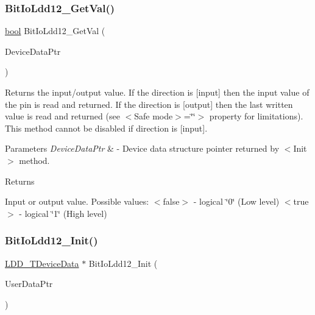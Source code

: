 \subsubsection{\texorpdfstring{Bit\+Io\+Ldd12\+\_\+\+Get\+Val()}{BitIoLdd12\_GetVal()}}
{\footnotesize\ttfamily \hyperlink{group___p_e___types__module_ga97a80ca1602ebf2303258971a2c938e2}{bool} Bit\+Io\+Ldd12\+\_\+\+Get\+Val (\begin{DoxyParamCaption}\item[{\hyperlink{group___p_e___types__module_gac5cf1362f1f0e3a2ce71b1bf2276d091}{L\+D\+D\+\_\+\+T\+Device\+Data} $\ast$}]{Device\+Data\+Ptr }\end{DoxyParamCaption})}



Returns the input/output value. If the direction is \mbox{[}input\mbox{]} then the input value of the pin is read and returned. If the direction is \mbox{[}output\mbox{]} then the last written value is read and returned (see $<$\+Safe mode$>$=\char`\"{}\char`\"{}$>$ property for limitations). This method cannot be disabled if direction is \mbox{[}input\mbox{]}. 


\begin{DoxyParams}{Parameters}
{\em Device\+Data\+Ptr} & -\/ Device data structure pointer returned by $<$\+Init$>$ method. \\
\hline
\end{DoxyParams}
\begin{DoxyReturn}{Returns}

\begin{DoxyItemize}
\item Input or output value. Possible values\+: $<$false$>$ -\/ logical \char`\"{}0\char`\"{} (Low level) $<$true$>$ -\/ logical \char`\"{}1\char`\"{} (High level) 
\end{DoxyItemize}
\end{DoxyReturn}
\mbox{\label{group___bit_io_ldd12__module_ga504f7c338d40c89bfbb418cd2c1c3a8b}} 
\subsubsection{\texorpdfstring{Bit\+Io\+Ldd12\+\_\+\+Init()}{BitIoLdd12\_Init()}}
{\footnotesize\ttfamily \hyperlink{group___p_e___types__module_gac5cf1362f1f0e3a2ce71b1bf2276d091}{L\+D\+D\+\_\+\+T\+Device\+Data} $\ast$ Bit\+Io\+Ldd12\+\_\+\+Init (\begin{DoxyParamCaption}\item[{\hyperlink{group___p_e___types__module_ga0b66a73f87238a782318aa0be7578e35}{L\+D\+D\+\_\+\+T\+User\+Data} $\ast$}]{User\+Data\+Ptr }\end{DoxyParamCaption})}



